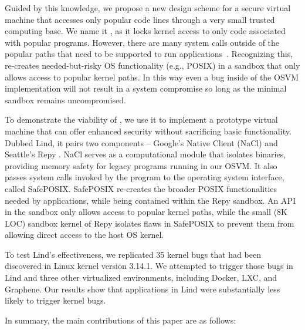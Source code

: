 Guided by this knowledge, we propose a new design scheme for a secure virtual machine that
accesses only popular code lines through a very small trusted computing base.
We name it \lip, as it locks kernel access to only code
associated with popular programs. %
However, there are many system calls outside of the popular paths that need to
be supported to run applications~\cite{tsai2016study}.  Recognizing this,
 \lip re-creates needed-but-risky OS functionality
(e.g., POSIX) in a sandbox that only allows access to popular kernel paths.
In this way even a bug inside of the OSVM implementation will not result in a system compromise
so long as the minimal sandbox remains uncompromised.


To demonstrate the viability of \lip, we use it to implement a
prototype virtual machine that can offer enhanced security without sacrificing
basic functionality. Dubbed Lind, it pairs two components -- Google's Native Client
(NaCl) \cite{NaCl-09} and Seattle's Repy \cite{Repy-10}.
NaCl serves as a computational module that isolates
binaries, providing memory safety for legacy programs running in our OSVM.
It also passes system calls invoked by the program to the operating system interface, called SafePOSIX.
SafePOSIX re-creates the broader POSIX functionalities needed by applications, while being contained within the Repy sandbox. 
An API in the sandbox only allows access to popular kernel paths, while
the small (8K LOC) sandbox kernel of Repy isolates flaws in SafePOSIX
to prevent them from allowing direct access to the host OS kernel.

To test Lind's effectiveness, we replicated 35 kernel bugs that had been
discovered in Linux kernel version 3.14.1.  We attempted to trigger those
bugs in Lind and three other virtualized environments,
including Docker, LXC, and Graphene.
Our results show that applications in Lind were substantially less likely to trigger
kernel bugs.

In summary, the main contributions of this paper are as follows:

